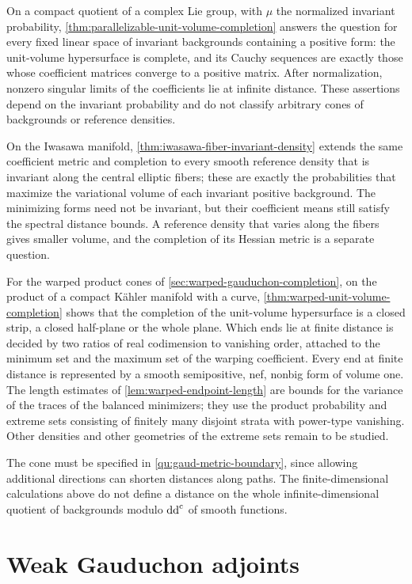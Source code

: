 On a compact quotient of a complex Lie group, with $\mu$ the normalized invariant probability, \cref{thm:parallelizable-unit-volume-completion} answers the question for every fixed linear space of invariant backgrounds containing a positive form: the unit-volume hypersurface is complete, and its Cauchy sequences are exactly those whose coefficient matrices converge to a positive matrix. After normalization, nonzero singular limits of the coefficients lie at infinite distance. These assertions depend on the invariant probability and do not classify arbitrary cones of backgrounds or reference densities.

On the Iwasawa manifold, \cref{thm:iwasawa-fiber-invariant-density} extends the same coefficient metric and completion to every smooth reference density that is invariant along the central elliptic fibers; these are exactly the probabilities that maximize the variational volume of each invariant positive background. The minimizing forms need not be invariant, but their coefficient means still satisfy the spectral distance bounds. A reference density that varies along the fibers gives smaller volume, and the completion of its Hessian metric is a separate question.

For the warped product cones of \cref{sec:warped-gauduchon-completion}, on the product of a compact K\"ahler manifold with a curve, \cref{thm:warped-unit-volume-completion} shows that the completion of the unit-volume hypersurface is a closed strip, a closed half-plane or the whole plane. Which ends lie at finite distance is decided by two ratios of real codimension to vanishing order, attached to the minimum set and the maximum set of the warping coefficient. Every end at finite distance is represented by a smooth semipositive, nef, nonbig form of volume one. The length estimates of \cref{lem:warped-endpoint-length} are bounds for the variance of the traces of the balanced minimizers; they use the product probability and extreme sets consisting of finitely many disjoint strata with power-type vanishing. Other densities and other geometries of the extreme sets remain to be studied.

The cone must be specified in \cref{qu:gaud-metric-boundary}, since allowing additional directions can shorten distances along paths. The finite-dimensional calculations above do not define a distance on the whole infinite-dimensional quotient of backgrounds modulo $\mathrm{dd}^{\mathrm{c}}$ of smooth functions.

\section{Weak Gauduchon adjoints}

